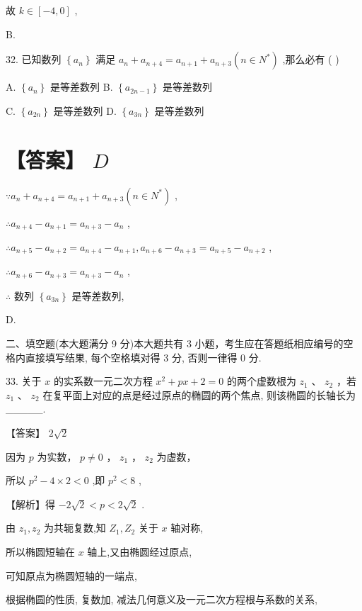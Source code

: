 \documentclass[10pt]{article}
\begin{document}
故 \(k \in  \left\lbrack  {-4,0}\right\rbrack\) ,

B.

32. 已知数列 \(\left\{  {a}_{n}\right\}\) 满足 \({a}_{n} + {a}_{n + 4} = {a}_{n + 1} + {a}_{n + 3}\left( {n \in  {N}^{ * }}\right)\) ,那么必有 ( )

A. \(\left\{  {a}_{n}\right\}\) 是等差数列 B. \(\left\{  {a}_{{2n} - 1}\right\}\) 是等差数列

C. \(\left\{  {a}_{2n}\right\}\) 是等差数列 D. \(\left\{  {a}_{3n}\right\}\) 是等差数列

\section*{【答案】 \(D\)}

\(\because {a}_{n} + {a}_{n + 4} = {a}_{n + 1} + {a}_{n + 3}\left( {n \in  {N}^{ * }}\right)\) ,

\(\therefore {a}_{n + 4} - {a}_{n + 1} = {a}_{n + 3} - {a}_{n}\) ,

\(\therefore {a}_{n + 5} - {a}_{n + 2} = {a}_{n + 4} - {a}_{n + 1},{a}_{n + 6} - {a}_{n + 3} = {a}_{n + 5} - {a}_{n + 2}\) ,

\(\therefore {a}_{n + 6} - {a}_{n + 3} = {a}_{n + 3} - {a}_{n}\) ,

\(\therefore\) 数列 \(\left\{  {a}_{3n}\right\}\) 是等差数列,

D.

二、填空题(本大题满分 9 分)本大题共有 3 小题，考生应在答题纸相应编号的空格内直接填写结果, 每个空格填对得 3 分, 否则一律得 0 分.

33. 关于 \(x\) 的实系数一元二次方程 \({x}^{2} + {px} + 2 = 0\) 的两个虚数根为 \({z}_{1}\text{ 、 }{z}_{2}\) ，若 \({z}_{1}\text{ 、 }{z}_{2}\) 在复平面上对应的点是经过原点的椭圆的两个焦点, 则该椭圆的长轴长为\_\_\_\_\_.

【答案】 \(2\sqrt{2}\)

因为 \(p\) 为实数， \(p \neq  0\) ， \({z}_{1}\) ， \({z}_{2}\) 为虚数，

所以 \({p}^{2} - 4 \times  2 < 0\) ,即 \({p}^{2} < 8\) ,

【解析】得 \(- 2\sqrt{2} < p < 2\sqrt{2}\) .

由 \({z}_{1},{z}_{2}\) 为共轭复数,知 \({Z}_{1},{Z}_{2}\) 关于 \(x\) 轴对称,

所以椭圆短轴在 \(x\) 轴上,又由椭圆经过原点,

可知原点为椭圆短轴的一端点,

根据椭圆的性质, 复数加, 减法几何意义及一元二次方程根与系数的关系,
\end{document}
